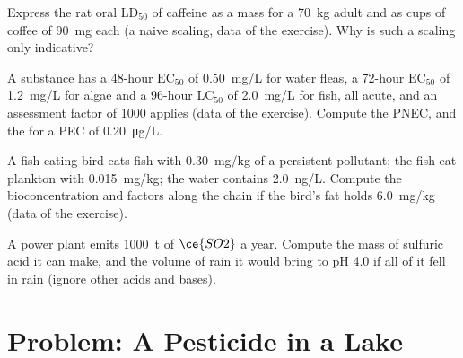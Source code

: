 \begin{exercise}[$\star\star$]\label{exo:b3:environmental-toxicology:9}
Express the rat oral $\mathrm{LD_{50}}$ of caffeine as a mass for a \qty{70}{kg} adult and as cups of coffee of
\qty{90}{mg} each (a naive scaling, data of the exercise). Why is such a scaling only indicative?
\end{exercise}

\begin{exercise}[$\star\star\star$]\label{exo:b3:environmental-toxicology:10}
A substance has a 48-hour $\mathrm{EC_{50}}$ of \qty{0.50}{mg/L} for water fleas, a 72-hour $\mathrm{EC_{50}}$ of \qty{1.2}{mg/L} for algae
and a 96-hour $\mathrm{LC_{50}}$ of \qty{2.0}{mg/L} for fish, all acute, and an assessment factor of 1000 applies
(data of the exercise). Compute the PNEC, and the  for a PEC of \qty{0.20}{\micro g/L}.
\end{exercise}

\begin{exercise}[$\star\star\star$]\label{exo:b3:environmental-toxicology:11}
A fish-eating bird eats fish with \qty{0.30}{mg/kg} of a persistent pollutant; the fish eat
plankton with \qty{0.015}{mg/kg}; the water contains \qty{2.0}{ng/L}. Compute the bioconcentration and
 factors along the chain if the bird's fat holds \qty{6.0}{mg/kg} (data of the
exercise).
\end{exercise}

\begin{exercise}[$\star\star\star$]\label{exo:b3:environmental-toxicology:12}
A power plant emits \qty{1000}{t} of $\ce{SO2}$ a year. Compute the mass of sulfuric acid it can make,
and the volume of rain it would bring to pH 4.0 if all of it fell in rain (ignore other
acids and bases).
\end{exercise}

\section{Problem: A Pesticide in a Lake}

